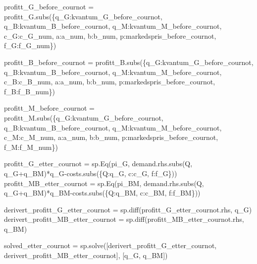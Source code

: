 \documentclass[
  12pt,
  a4paper,
  DIV=11,
  numbers=noendperiod]{scrartcl}
\newenvironment{Shaded}{\begin{snugshade}}{\end{snugshade}}
\newcommand{\NormalTok}[1]{\textcolor[rgb]{0.00,0.23,0.31}{#1}}
\newcommand{\OperatorTok}[1]{\textcolor[rgb]{0.37,0.37,0.37}{#1}}
\begin{document}
\begin{Shaded}
\begin{Highlighting}[]
\NormalTok{profitt\_G\_before\_cournot }\OperatorTok{=}\NormalTok{ profitt\_G.subs(\{q\_G:kvantum\_G\_before\_cournot, q\_B:kvantum\_B\_before\_cournot, q\_M:kvantum\_M\_before\_cournot, c\_G:c\_G\_num, a:a\_num, b:b\_num, p:markedspris\_before\_cournot, f\_G:f\_G\_num\})}


\NormalTok{profitt\_B\_before\_cournot }\OperatorTok{=}\NormalTok{ profitt\_B.subs(\{q\_G:kvantum\_G\_before\_cournot, q\_B:kvantum\_B\_before\_cournot, q\_M:kvantum\_M\_before\_cournot, c\_B:c\_B\_num, a:a\_num, b:b\_num, p:markedspris\_before\_cournot, f\_B:f\_B\_num\})}


\NormalTok{profitt\_M\_before\_cournot }\OperatorTok{=}\NormalTok{ profitt\_M.subs(\{q\_G:kvantum\_G\_before\_cournot, q\_B:kvantum\_B\_before\_cournot, q\_M:kvantum\_M\_before\_cournot, c\_M:c\_M\_num, a:a\_num, b:b\_num, p:markedspris\_before\_cournot, f\_M:f\_M\_num\})}
\end{Highlighting}
\end{Shaded}

\begin{Shaded}
\begin{Highlighting}[]
\NormalTok{profitt\_G\_etter\_cournot }\OperatorTok{=}\NormalTok{ sp.Eq(pi\_G, demand.rhs.subs(Q, q\_G}\OperatorTok{+}\NormalTok{q\_BM)}\OperatorTok{*}\NormalTok{q\_G}\OperatorTok{{-}}\NormalTok{costs.subs(\{Q:q\_G, c:c\_G, f:f\_G\}))}
\NormalTok{profitt\_MB\_etter\_cournot }\OperatorTok{=}\NormalTok{ sp.Eq(pi\_BM, demand.rhs.subs(Q, q\_G}\OperatorTok{+}\NormalTok{q\_BM)}\OperatorTok{*}\NormalTok{q\_BM}\OperatorTok{{-}}\NormalTok{costs.subs(\{Q:q\_BM, c:c\_BM, f:f\_BM\}))}
\end{Highlighting}
\end{Shaded}

\begin{Shaded}
\begin{Highlighting}[]
\NormalTok{derivert\_profitt\_G\_etter\_cournot }\OperatorTok{=}\NormalTok{ sp.diff(profitt\_G\_etter\_cournot.rhs, q\_G)}
\NormalTok{derivert\_profitt\_MB\_etter\_cournot }\OperatorTok{=}\NormalTok{ sp.diff(profitt\_MB\_etter\_cournot.rhs, q\_BM)}

\NormalTok{solved\_etter\_cournot }\OperatorTok{=}\NormalTok{ sp.solve([derivert\_profitt\_G\_etter\_cournot, derivert\_profitt\_MB\_etter\_cournot], [q\_G, q\_BM])}
\end{Highlighting}
\end{Shaded}
\end{document}
